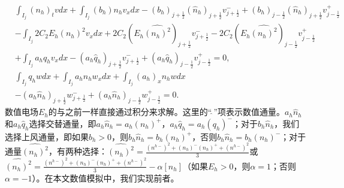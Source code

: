 \begin{align}
     & \int_{I_{j}} (n_h)_t v d x+\int_{I_{j}}\left(b_h\right) n_h v_{x} d x                                                                    -\left(b_h\right)_{j+\frac{1}{2}} (\hat{n}_h)_{j+\frac{1}{2}} v_{j+\frac{1}{2}}^{-}  +\left(b_h\right)_{j-\frac{1}{2}} (\hat{n}_h)_{j+\frac{1}{2}} v_{j-\frac{1}{2}}^{+}                                                                                                                                   \nonumber \\
     & -\int_{I_{j}} 2 C_{2} E_h\left(n_h\right)^{2} v_{x} d x+2 C_{2}\left(E_h \widehat{\left(n_h\right)^{2}}\right)_{j+\frac{1}{2}} v_{j+\frac{1}{2}}^{-}-2 C_{2}\left(E_h \widehat{\left(n_h\right)^{2}}\right)_{j-\frac{1}{2}} v_{j-\frac{1}{2}}^{+} \nonumber                                                                                                                                                                                                   \\
     & +\int_{I_{j}} a_h q_h v_{x} d x -\left(a_h \hat{q}_{h}\right)_{j+\frac{1}{2}} v_{j+\frac{1}{2}}^{-}+\left(a_h \hat{q}_{h}\right)_{j-\frac{1}{2}} v_{j-\frac{1}{2}}^{+}=0,             \label{eq:HFRewrittenLDGa}                                                                                                                                                                                                                                              \\
     & \int_{I_{j}} q_h w d x+\int_{I_{j}} a_h n_h w_{x} d x+\int_{I_{j}}\left(a_h\right)_{x} n_h w d x                        \nonumber                                                                                                                                                                                                                                                                                                                             \\
     & -\left(a_h \hat{n}_{h}\right)_{j+\frac{1}{2}} w_{j+\frac{1}{2}}^{-}+\left(a_h \hat{n}_{h}\right)_{j-\frac{1}{2}} w_{j-\frac{1}{2}}^{+}=0 .\label{eq:HFRewrittenLDGb}
\end{align}
数值电场$E_h$的与之前一样直接通过积分来求解。这里的“$\widehat{\ }$”项表示数值通量。$a_h \hat{n}_{h}$和$a_h \hat{q}_{h}$选择交替通量，即$a_h \hat{n}_{h}=a_h\left(n_h\right)^{+}$，$a_h \hat{q}_{h}=a_h\left(q_h\right)^{-}$；对于$b_h \hat{n}_{h}$，我们选择上风通量，即如果$b_h>0$，则$b_h \hat{n}_{h}=b_h\left(n_h\right)^{+}$，否则$b_h \hat{n}_{h}=b_h\left(n_h\right)^{-}$；对于通量$\widehat{\left(n_h\right)^{2}}$，有两种选择：$\widehat{\left(n_h\right)^{2}}=\frac{\left(n^{h-}\right)^{2}+\left(n_h\right)^{-}\left(n_h\right)^{+}+\left(n^{h-}\right)^{2}}{3}$或$\widehat{\left(n_h\right)^{2}}=\frac{\left(n^{h-}\right)^{2}+\left(n_h\right)^{-}\left(n_h\right)^{+}+\left(n^{h-}\right)^{2}}{3}-\alpha\left[n_h\right]$（如果$E_h>0$，则$\alpha=1$；否则$\alpha=-1$）。在本文数值模拟中，我们实现前者。
